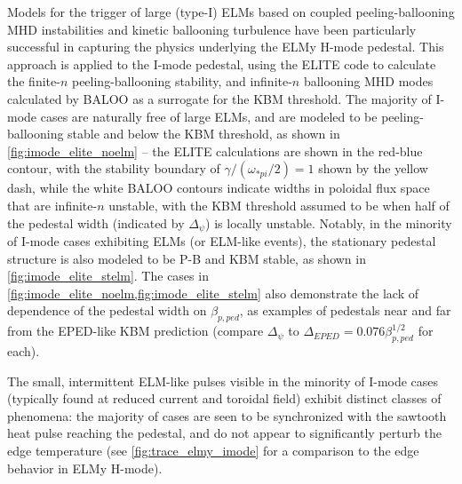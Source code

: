 \documentclass[ twoside,openright,titlepage,numbers=noenddot,headinclude,%
                footinclude=true,cleardoublepage=empty,abstractoff, %
                BCOR=5mm,paper=letter,fontsize=11pt,%
                ngerman,american,%
                ]{scrreprt}
\begin{document}
Models for the trigger of large (type-I) ELMs based on coupled peeling-ballooning MHD instabilities and kinetic ballooning turbulence have been particularly successful in capturing the physics underlying the ELMy H-mode pedestal.  This approach is applied to the I-mode pedestal, using the ELITE code to calculate the finite-$n$ peeling-ballooning stability, and infinite-$n$ ballooning MHD modes calculated by BALOO as a surrogate for the KBM threshold.  The majority of I-mode cases are naturally free of large ELMs, and are modeled to be peeling-ballooning stable and below the KBM threshold, as shown in \cref{fig:imode_elite_noelm} -- the ELITE calculations are shown in the red-blue contour, with the stability boundary of $\gamma/(\omega_{*pi}/2) = 1$ shown by the yellow dash, while the white BALOO contours indicate widths in poloidal flux space that are infinite-$n$ unstable, with the KBM threshold assumed to be when half of the pedestal width (indicated by $\Delta_\psi$) is locally unstable.  Notably, in the minority of I-mode cases exhibiting ELMs (or ELM-like events), the stationary pedestal structure is also modeled to be P-B and KBM stable, as shown in \cref{fig:imode_elite_stelm}.  The cases in \cref{fig:imode_elite_noelm,fig:imode_elite_stelm} also demonstrate the lack of dependence of the pedestal width on $\beta_{p,ped}$, as examples of pedestals near and far from the EPED-like KBM prediction (compare $\Delta_\psi$ to $\Delta_{EPED} = 0.076 \beta_{p,ped}^{1/2}$ for each).

The small, intermittent ELM-like pulses visible in the minority of I-mode cases (typically found at reduced current and toroidal field) exhibit distinct classes of phenomena: the majority of cases are seen to be synchronized with the sawtooth heat pulse reaching the pedestal, and do not appear to significantly perturb the edge temperature (see \cref{fig:trace_elmy_imode} for a comparison to the edge behavior in ELMy H-mode).
\end{document}
